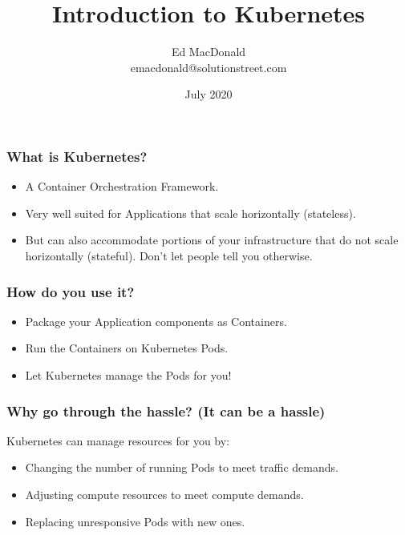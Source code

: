 

\usepackage[utf8]{inputenc}
\usepackage{minted}
\usepackage{listings}
\usepackage{graphicx}
\usepackage{xcolor}
\usepackage{adjustbox}




\title[Kubernetes]{Introduction to Kubernetes}
\author[Ed MacDonald]{Ed MacDonald\\emacdonald@solutionstreet.com}
\date{July 2020}



\frame{\titlepage}

\begin{frame}
\frametitle{What is Kubernetes?}
\begin{itemize}
    \item{A Container Orchestration Framework.}\pause
    \item{Very well suited for Applications that scale horizontally (stateless).}\pause
    \item{But can also accommodate portions of your infrastructure that do not scale horizontally (stateful). Don't let people tell you otherwise.}
\end{itemize}
\end{frame}

\begin{frame}
    \frametitle{How do you use it?}
    \begin{itemize}
        \item{Package your Application components as Containers.}\pause
        \item{Run the Containers on Kubernetes Pods.}\pause
        \item{Let Kubernetes manage the Pods for you!}
    \end{itemize}
\end{frame}

\begin{frame}
    \frametitle{Why go through the hassle? (It can be a hassle)}
    Kubernetes can manage resources for you by:\pause
    \begin{itemize}
        \item{Changing the number of running Pods to meet traffic demands.}\pause
        \item{Adjusting compute resources to meet compute demands.}\pause
        \item{Replacing unresponsive Pods with new ones.}
    \end{itemize}
\end{frame}

